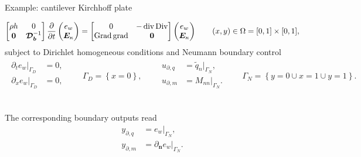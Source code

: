 \documentclass[aspectratio=169]{ISAE-Beamer}
\DeclareMathOperator*{\grad}{grad}
\DeclareMathOperator*{\Grad}{Grad}
\DeclareMathOperator*{\Div}{Div}
\renewcommand{\div}{\operatorname{div}}
\begin{document}
\begin{frame}{Example: cantilever Kirchhoff plate}

\begin{equation*}
\begin{bmatrix}
\rho h & 0 \\ 
\bm{0} & \bm{\mathcal{D}_b}^{-1} \\
\end{bmatrix}
\diffp{}{t}
\begin{pmatrix}
e_w \\ \bm{E}_\kappa \\
\end{pmatrix} = 
\begin{bmatrix}
0 & -\div\Div \\ 
\Grad\grad & \bm{0} \\
\end{bmatrix}
\begin{pmatrix}
e_w \\ \bm{E}_\kappa \\
\end{pmatrix} \qquad (x, y) \in \Omega = [0, 1]\times[0,1],
\end{equation*}
subject to Dirichlet homogeneous conditions and Neumann boundary control
\begin{align*}
\begin{aligned}
\partial_t e_w|_{\Gamma_D} &= 0, \\
\partial_x e_w|_{\Gamma_D} &= 0, \\
\end{aligned} \qquad {\Gamma_D} = \left\{x = 0 \right\}, \qquad
\begin{aligned}
u_{\partial, q} & = \widetilde{q}_n|_{\Gamma_N},\\
u_{\partial, m} &= M_{nn}|_{\Gamma_N}.\\
\end{aligned} \qquad {\Gamma_N} = \left\{y = 0 \cup x=1 \cup y=1 \right\}.
\end{align*}

\begin{columns}
	\begin{column}{.5\textwidth}
		The corresponding boundary outputs read
		\begin{equation*}
		\begin{aligned}
		y_{\partial, q} &= e_w|_{\Gamma_N}, \\
		y_{\partial, m} &=\partial_{\bm{n}} e_w|_{\Gamma_N}.
		\end{aligned}
		\end{equation*}
		

\end{column}
\end{columns}
\end{frame}
\end{document}
